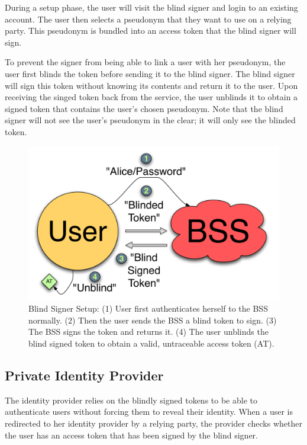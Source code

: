 \documentclass{llncs}
\begin{document}
During a setup phase, the user will visit the blind signer and login
to an existing account. The user then selects a pseudonym that they
want to use on a relying party. This pseudonym is bundled into an
access token that the blind signer will sign.

To prevent the signer from being able to link a user with her
pseudonym, the user first blinds the token before sending it to the
blind signer. The blind signer will sign this token without knowing
its contents and return it to the user. Upon receiving the singed
token back from the service, the user unblinds it to obtain a signed
token that contains the user's chosen pseudonym. Note that the blind
signer will not see the user's pseudonym in the clear; it will only
see the blinded token.

\begin{figure}
  \centering
  \includegraphics[scale=0.6]{figs/fig-bss-setup-color.pdf}
  \caption{Blind Signer Setup: (1) User first authenticates herself to the BSS
  normally. (2) Then the user sends the BSS a blind token to sign. (3) The BSS
  signs the token and returns it. (4) The user unblinds the blind signed token
  to obtain a valid, untraceable access token (AT).}
  \label{fig:bss-setup}
\end{figure}

\subsection{Private Identity Provider}

The identity provider relies on the blindly signed tokens to be able
to authenticate users without forcing them to reveal their
identity. When a user is redirected to her identity provider by a
relying party, the provider checks whether the user has an access
token that has been signed by the blind signer.
\end{document}
